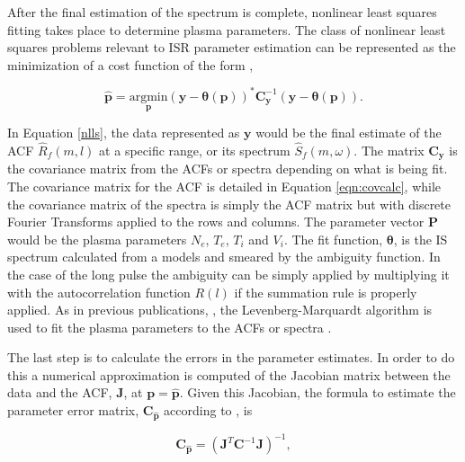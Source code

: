 After the final estimation of the spectrum is complete, nonlinear least squares fitting takes place to determine plasma parameters.  
The class of nonlinear least squares problems relevant to ISR parameter estimation can be represented as the minimization of a cost function of the form \cite{kayvol1},

\begin{equation}
	\mathbf{\hat{p}}= \underset{\mathbf{p}}{\text{argmin}} (\mathbf{y}-\bm{\theta}(\mathbf{p}))^*\mathbf{C}_{\mathbf{y}}^{-1}(\mathbf{y}-\bm{\theta}(\mathbf{p})).
\label{nlls}
\end{equation}

In Equation \ref{nlls}, the data represented as $\mathbf{y}$ would be the final estimate of the ACF $\widehat{R}_f(m,l)$ at a specific range, or its spectrum $\widehat{S}_f(m,\omega)$. The matrix $\mathbf{C}_{\mathbf{y}}$  is the covariance matrix from the ACFs or spectra depending on what is being fit. The covariance matrix for the ACF is detailed in Equation \ref{eqn:covcalc}, while the covariance matrix of the spectra is simply the ACF matrix but with discrete Fourier Transforms applied to the rows and columns. The parameter vector $\mathbf{P}$ would be the plasma parameters $N_e$, $T_e$, $T_i$ and $V_i$. The fit function, $\bm{\theta}$, is the IS spectrum calculated from a models \cite{kudeki:milla:1} and smeared by the ambiguity function. In the case of the long pulse the ambiguity can be simply applied by multiplying it with the autocorrelation function $R(l)$ if the summation rule is properly applied. As in previous publications, \cite{nikoukar2008}, the Levenberg-Marquardt algorithm is used to fit the plasma parameters to the ACFs or spectra \cite{levenberg1944,marquardt:1963}.

The last step is to calculate the errors in the parameter estimates. In order to do this a numerical approximation is computed of the Jacobian matrix between the data and the ACF, $\mathbf{J}$, at $\mathbf{p}=\mathbf{\hat{p}}$. Given this Jacobian, the formula to estimate the parameter error matrix, $\mathbf{C}_{\mathbf{\hat{p}}}$ according to \cite{Hysell:2000cq}, is

\begin{equation}
\label{eqn:jacinv}
\mathbf{C}_{\mathbf{\hat{p}}}=(\mathbf{J}^T \mathbf{C}^{-1}\mathbf{J})^{-1},
\end{equation}

